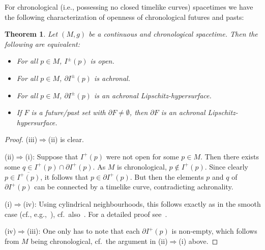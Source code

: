 \documentclass[reqno]{amsart}
\numberwithin{equation}{section}
\theoremstyle{plain}
\newtheorem{theorem}{Theorem}[section]
\theoremstyle{definition}
\theoremstyle{remark}
\begin{document}
For chronological (i.e., possessing no closed timelike curves) spacetimes we have the following characterization of openness of chronological
futures and pasts:
\begin{theorem}\label{th:iplusachronal}
	Let $(M,g)$ be a continuous and chronological spacetime. Then the following are equivalent:
	\begin{itemize}
		\item[(i)] For all $p\in M$, $I^\pm(p)$ is open.
		\item[(ii)] For all $p\in M$, $\partial I^\pm(p)$ is achronal. 
		\item[(iii)] For all $p\in M$, $\partial I^\pm(p)$ is an achronal Lipschitz-hypersurface.
		\item[(iv)] If $F$ is a future/past set with $\partial F\not=\emptyset$, then $\partial F$ 
		is an achronal Lipschitz-hypersurface.
	\end{itemize}
\end{theorem}
\begin{proof} (iii)$\Rightarrow$(ii) is clear.
	
	
\noindent (ii)$\Rightarrow$(i): Suppose that $I^+(p)$ were not open for some $p\in M$. Then there exists some $q\in I^+(p)\cap \partial I^+(p)$. As $M$ is chronological, $p\not\in I^+(p)$.
 Since clearly $p\in \overline{I^+(p)}$, it follows that $p\in \partial I^+(p)$. But then the elements $p$ and $q$ of $\partial I^+(p)$ can be connected by a timelike curve, contradicting achronality.


\noindent (i)$\Rightarrow$(iv): Using cylindrical neighbourhoods, this follows exactly as in the smooth case (cf., e.g.,~\cite[Cor.\ 14.27]{ONe:83}), cf.\ also~\cite[Proof of Thm.\ 2.6]{GL:17}. 
For a detailed proof see~\cite[Thm.\ 2.3.5]{Lec:16}.

\noindent (iv)$\Rightarrow$(iii): One only has to note that each $\partial I^+(p)$ is non-empty, 
which follows from $M$ being chronological, cf.\ the argument in (ii)$\Rightarrow$(i) above.
\end{proof}
\end{document}
